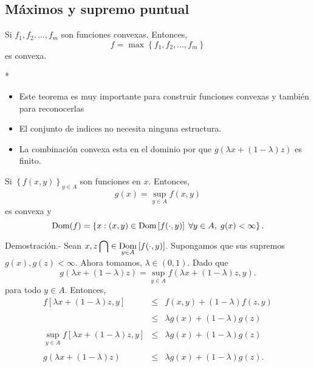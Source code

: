 \begin{paracol}{2}
\subsection{Máximos y supremo puntual}

\begin{teo} Si $f_1,f_2,\ldots,f_m$ son funciones convexas. Entonces,
    $$f=\max\left\{f_1,f_2,\ldots,f_m\right\}$$ 
    es convexa.
\end{teo}

\switchcolumn[1]*{\noindent\scriptsize
	\begin{itemize}
	    \item Este teorema es muy importante para construir funciones convexas y también para reconocerlas
	    \item El conjunto de indices no necesita ninguna estructura.
	    \item La combinación convexa  esta en el dominio por que $g(\lambda x+(1-\lambda)z)$ es finito. 
	\end{itemize}
}
\switchcolumn[0]\noindent
\begin{teo} Si $\left\{f(x,y)\right\}_{y\in A}$ son funciones en $x$. Entonces,
    $$g(x)=\sup_{y\in A}f(x,y)$$
    es convexa y 
    $$\mathop{\mbox{\normalfont Dom}}\nolimits(f)=\left\{x:(x,y)\in \mathop{\mbox{\normalfont Dom}}\nolimits\left[f(\cdot,y)\right]\;\forall y\in A,\; g(x)<\infty\right\}.$$

    Demostración.-\; Sean $x,z \displaystyle\bigcap \in \underset{y\in A}{\mathop{\mbox{\normalfont Dom}}\nolimits}\left[f(\cdot,y)\right]$. Supongamos que sus supremos $g(x), g(z)<\infty$. Ahora tomamos, $\lambda\in (0,1)$. Dado que
    $$g(\lambda x + (1-\lambda)z)=\sup_{y\in A}f(\lambda x + (1-\lambda)z,y).$$
     para todo $y\in A$. Entonces,
    $$
    \begin{array}{rcl}
	f\left[\lambda x + (1-\lambda)z,y\right] &\leq& f(x,y) + (1-\lambda)f(z,y)\\\\
	&\leq& \lambda g(x)+(1-\lambda)g(z)\\\\
	\underset{y\in A}{\sup}f\left[\lambda x + (1-\lambda)z,y\right] &\leq& \lambda g(x)+(1-\lambda)g(z)\\\\
	g(\lambda x + (1-\lambda)z) &\leq& \lambda g(x)+(1-\lambda)g(z).
    \end{array}
    $$
\end{teo}


\end{paracol}
